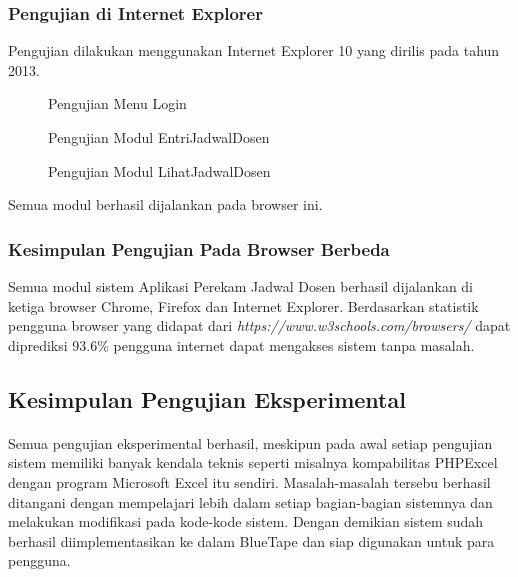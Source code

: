 \subsubsection{Pengujian di Internet Explorer}
Pengujian dilakukan menggunakan Internet Explorer 10 yang dirilis pada tahun 2013.
\begin{figure} [H]
	\centering  
	\caption[Pengujian Menu Login]{Pengujian Menu Login} 
	\end{figure}
\begin{figure} [H]
	\centering  
	\caption[Pengujian Modul EntriJadwalDosen]{Pengujian Modul EntriJadwalDosen} 
	\end{figure}
\begin{figure} [H]
	\centering  
	\caption[Pengujian Modul LihatJadwalDosen]{Pengujian Modul LihatJadwalDosen} 
	\end{figure}
Semua modul berhasil dijalankan pada browser ini.
\subsubsection{Kesimpulan Pengujian Pada Browser Berbeda}
Semua modul sistem Aplikasi Perekam Jadwal Dosen berhasil dijalankan di ketiga browser Chrome, Firefox dan Internet Explorer. Berdasarkan statistik pengguna browser yang didapat dari \textit{https://www.w3schools.com/browsers/} dapat diprediksi 93.6\% pengguna internet dapat mengakses sistem  tanpa masalah.
\subsection{Kesimpulan Pengujian Eksperimental}
\paragraph{}Semua pengujian eksperimental berhasil, meskipun pada awal setiap pengujian sistem memiliki banyak kendala teknis seperti misalnya kompabilitas PHPExcel dengan program Microsoft Excel itu sendiri. Masalah-masalah tersebu berhasil ditangani dengan mempelajari lebih dalam setiap bagian-bagian sistemnya dan melakukan modifikasi pada kode-kode sistem. Dengan demikian sistem sudah berhasil diimplementasikan ke dalam BlueTape dan siap digunakan untuk para pengguna.